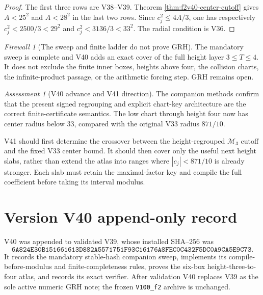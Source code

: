 \documentclass[11pt]{article}
\theoremstyle{definition}
\theoremstyle{remark}
\newtheorem{assessment}[theorem]{Assessment}
\newtheorem{firewall}[theorem]{Firewall}
\begin{document}
\begin{proof}
The first three rows are V38--V39.  Theorem
\ref{thm:f2v40-center-cutoff} gives \(A<25^2\) and \(A<28^2\) in the last
two rows.  Since \(c_j^2\leq4A/3\), one has respectively
\(c_j^2<2500/3<29^2\) and \(c_j^2<3136/3<33^2\).  The radial condition is
V36.
\end{proof}

\begin{firewall}[The sweep and finite ladder do not prove GRH]
\label{fire:f2v40}
The mandatory sweep is complete and V40 adds an exact cover of the full
height layer \(3\leq T\leq4\).  It does not exclude the finite inner boxes,
heights above four, the collision charts, the infinite-product passage, or
the arithmetic forcing step.  GRH remains open.
\end{firewall}

\begin{assessment}[V40 advance and V41 direction]
\label{ass:f2v40}
The companion methods confirm that the present signed regrouping and
explicit chart-key architecture are the correct finite-certificate
semantics.  The low chart through height four now has center radius below
\(33\), compared with the original V33 radius \(871/10\).

V41 should first determine the crossover between the height-regrouped
\(\mathcal M_3\) cutoff and the fixed V33 center bound.  It should then
cover only the useful next height slabs, rather than extend the atlas into
ranges where \(|c_j|<871/10\) is already stronger.  Each slab must retain
the maximal-factor key and compile the full coefficient before taking its
interval modulus.
\end{assessment}

\section*{Version V40 append-only record}

V40 was appended to validated V39, whose installed SHA--256 was
\[
 \texttt{6A824E30B151661613D882A5571751F93C16176A8FEC0C432F5DC0A9CA5E9C73}.
\tag{N40.11}
\]
It records the mandatory stable-hash companion sweep, implements its
compile-before-modulus and finite-completeness rules, proves the six-box
height-three-to-four atlas, and records its exact verifier.  After
validation V40 replaces V39 as the sole active numeric GRH note; the frozen
\texttt{V100\_f2} archive is unchanged.
\end{document}
